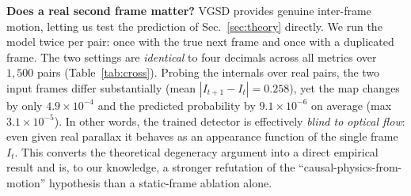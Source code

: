 \textbf{Does a real second frame matter?} VGSD provides genuine inter-frame
motion, letting us test the prediction of Sec.~\ref{sec:theory} directly. We run
the model twice per pair: once with the true next frame and once with a
duplicated frame. The two settings are \emph{identical} to four decimals across
all metrics over $1{,}500$ pairs (Table~\ref{tab:cross}). Probing the internals over real pairs, the
two input frames differ substantially (mean $|I_{t+1}-I_t|=0.258$), yet the
\ofcv{} map changes by only $4.9\times10^{-4}$ and the predicted probability by
$9.1\times10^{-6}$ on average (max $3.1\times10^{-5}$). In other words, the
trained \ofcv{} detector is effectively \emph{blind to optical flow}: even given
real parallax it behaves as an appearance function of the single frame
$I_t$. This converts the theoretical degeneracy argument into a direct empirical
result and is, to our knowledge, a stronger refutation of the
``causal-physics-from-motion'' hypothesis than a static-frame ablation alone.

